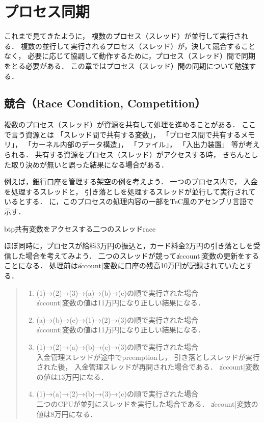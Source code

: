 \chapter{プロセス同期}
\label{synchronaization}
これまで見てきたように，
複数のプロセス（スレッド）が並行して実行される．
複数の並行して実行されるプロセス（スレッド）が，決して競合することなく，
必要に応じて協調して動作するために，プロセス（スレッド）間で同期をとる必要がある．
この章ではプロセス（スレッド）間の同期について勉強する．

\section{競合（Race Condition, Competition）}
複数のプロセス（スレッド）が資源を共有して処理を進めることがある．
ここで言う資源とは
「スレッド間で共有する変数」，
「プロセス間で共有するメモリ」，
「カーネル内部のデータ構造」，
「ファイル」，
「入出力装置」
等が考えられる．
共有する資源をプロセス（スレッド）がアクセスする時，
きちんとした取り決めが無いと誤った結果になる場合がある．

例えば，銀行口座を管理する架空の例を考えよう．
一つのプロセス内で，
入金を処理するスレッドと，
引き落としを処理するスレッドが並行して実行されているとする．
に，このプロセスの処理内容の一部をTeC風のアセンブリ言語で示す．

\begin{myfig}{btp}{共有変数をアクセスする二つのスレッド}{race}
  
\end{myfig}

ほぼ同時に，プロセスが給料3万円の振込と，カード料金2万円の引き落としを受信した場合を考えてみよう．
二つのスレッドが競って\|account|変数の更新をすることになる．
処理前は\|account|変数に口座の残高10万円が記録されていたとする．

\begin{quote}
  \begin{enumerate}
  \item (1)→(2)→(3)→(a)→(b)→(c)の順で実行された場合 \\
    \|account|変数の値は11万円になり正しい結果になる．

  \item (a)→(b)→(c)→(1)→(2)→(3)の順で実行された場合 \\
    \|account|変数の値は11万円になり正しい結果になる．

  \item (1)→(2)→(a)→(b)→(c)→(3)の順で実行された場合 \\
    入金管理スレッドが途中でpreemptionし，
    引き落としスレッドが実行された後，
    入金管理スレッドが再開された場合である．
    \|account|変数の値は13万円になる．

  \item (1)→(a)→(2)→(b)→(3)→(c)の順で実行された場合 \\
    二つのCPUが並列にスレッドを実行した場合である．
    \|account|変数の値は8万円になる．
  \end{enumerate}
\end{quote}

